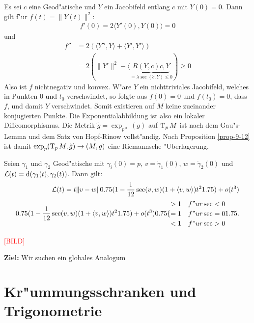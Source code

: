 \begin{bew}
Es sei $c$ eine Geod"atische und $Y$ ein Jacobifeld entlang $c$ mit $Y(0) = 0$. Dann gilt f"ur $f(t) = \|Y(t)\|^2$:
\begin{align*}
	f'(0) = 2 \langle Y'(0), Y(0) \rangle = 0
\end{align*}
und
\begin{align*}
	f'' &= 2 (\langle Y'', Y \rangle + \langle Y', Y' \rangle)\\
	&= 2 (\|Y'\|^2 - \langle \underbrace{R(Y, \dot c) \dot c, Y}_{=\lambda\sec(\dot c, Y) \le 0}) \ge 0
\end{align*}
Also ist $f$ nichtnegativ und konvex. W"are $Y$ ein nichttriviales Jacobifeld, welches in Punkten $0$ und $t_0$ verschwindet, so folgte aus $f(0) = 0$ und $f(t_0) = 0$, dass $f$, und damit $Y$ verschwindet.
Somit existieren auf $M$ keine zueinander konjugierten Punkte.
Die Exponentialabbildung ist also ein lokaler Diffeomorphismus.
Die Metrik $\tilde g = \exp_{p*}(g)$ auf $\operatorname{T}_pM$ ist nach dem Gau"s-Lemma und dem Satz von Hopf-Rinow vollst"andig.
Nach Proposition \ref{prop-9-12} ist damit $\exp_p(\operatorname{T}_pM, \tilde g) \to (M,g)$ eine Riemannsche "Uberlagerung.
\end{bew}

\begin{emptythm}
Seien $\gamma_1$ und $\gamma_2$ Geod"atische mit $\gamma_i(0) = p$, $v = \dot\gamma_1(0)$, $w = \dot\gamma_2(0)$ und $\operatorname{\mathcal{L}}(t) = \mathrm{d}(\gamma_1(t), \gamma_2(t))$. Dann gilt:
\begin{align*}
	\calL(t) = t \|v-w\| \left(1 - \frac{1}{12} \sec(v,w) (1 + \langle v, w \rangle) t^2\right) + o(t^3)\\
	\left(1 - \frac{1}{12} \sec(v,w) (1 + \langle v, w \rangle) t^2\right) + o(t^3) \begin{cases}
		>1 & f"ur \sec < 0\\
		=1 & f"ur \sec = 0\\
		<1 & f"ur \sec > 0
	\end{cases}
\end{align*}
\begin{center}\textcolor{red}{[BILD]}\end{center}
\end{emptythm}

\textbf{Ziel:} Wir suchen ein globales Analogum

\section{Kr"ummungsschranken und Trigonometrie}

